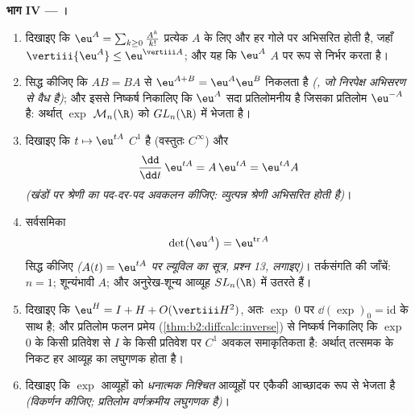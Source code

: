 \begin{problem}
\medskip
\noindent\textbf{भाग IV --- ।}
\begin{enumerate}[resume]
  \item दिखाइए कि $\eu^A = \sum_{k\geq0}\frac{A^k}{k!}$ प्रत्येक $A$ के लिए  और हर गोले पर
         अभिसरित होती है, जहाँ $\vertiii{\eu^A} \leq
        \eu^{\vertiii A}$; और यह कि $\eu^A$ $A$ पर
         रूप से निर्भर करता है।
  \item सिद्ध कीजिए कि $AB = BA$ से $\eu^{A+B} =
        \eu^A\eu^B$ निकलता है \emph{(, जो
        निरपेक्ष अभिसरण से वैध है)}; और इससे निष्कर्ष निकालिए कि $\eu^A$ सदा
        प्रतिलोमनीय है जिसका प्रतिलोम $\eu^{-A}$ है: अर्थात् $\exp$ $\mathcal M_n(\R)$ को $GL_n(\R)$ में
        भेजता है।
  \item दिखाइए कि $t \mapsto \eu^{tA}$ $C^1$ है (वस्तुतः $C^\infty$) और
        \[
        \frac{\dd}{\dd t}\,\eu^{tA} = A\,\eu^{tA} =
        \eu^{tA}A
        \]
        \emph{(खंडों पर श्रेणी का पद-दर-पद अवकलन कीजिए: व्युत्पन्न श्रेणी
         अभिसरित होती है)}।
  \item सर्वसमिका
        \[
        \det\bigl(\eu^{A}\bigr) = \eu^{\operatorname{tr}A}
        \]
        सिद्ध कीजिए \emph{($A(t) = \eu^{tA}$ पर ल्यूविल का सूत्र, प्रश्न 13, लगाइए)}।
        तर्कसंगति की जाँचें: $n = 1$; शून्यंभावी $A$; और अनुरेख-शून्य
        आव्यूह $SL_n(\R)$ में उतरते हैं।
  \item दिखाइए कि $\eu^H = I + H + O(\vertiii H^2)$, अतः $\exp$ $0$ पर $\dd(\exp)_0 =
        \mathrm{id}$ के साथ  है; और
        प्रतिलोम फलन प्रमेय (\cref{thm:b2:diffcalc:inverse}) से निष्कर्ष निकालिए कि $\exp$ $0$ के
        किसी प्रतिवेश से $I$ के किसी प्रतिवेश पर $C^1$ अवकल समाकृतिकता
        है: अर्थात् तत्समक के निकट हर आव्यूह का लघुगणक होता है।
  \item दिखाइए कि $\exp$  आव्यूहों को  \emph{धनात्मक निश्चित}
        आव्यूहों पर एकैकी आच्छादक रूप से भेजता है \emph{(विकर्णन कीजिए;
        प्रतिलोम वर्णक्रमीय लघुगणक है)}।
\end{enumerate}


\end{problem}
